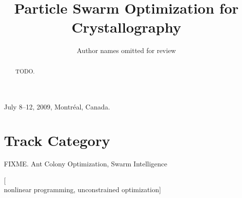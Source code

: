 \documentclass[letterpaper]{sig-alternate}
\begin{document}
\hyphenation{}

 {July 8--12, 2009, Montr\'eal, Canada.}

\title{Particle Swarm Optimization for Crystallography}
\date{}

\author{Author names omitted for review}

\maketitle

\begin{abstract}
TODO.
\end{abstract}

\section*{Track Category}
FIXME. Ant Colony Optimization, Swarm Intelligence

[\\ nonlinear programming, unconstrained optimization]
\end{document}
